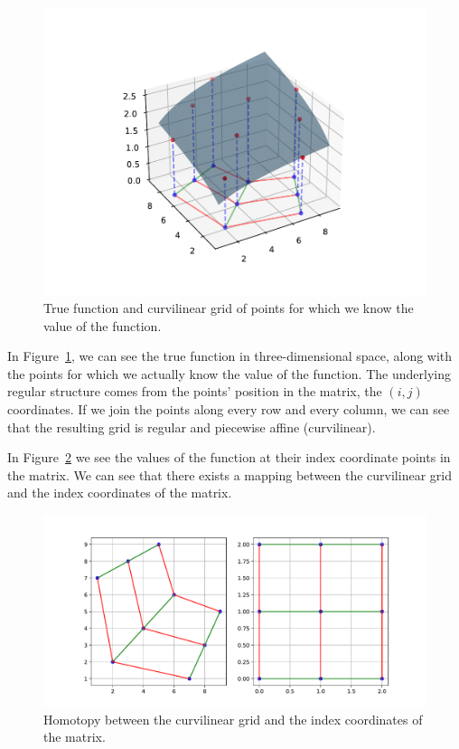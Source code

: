 \documentclass{article}
\begin{document}
\begin{figure}[!htbp]
\centering
\includegraphics[width=0.7\linewidth]{files/WarpedInterpolation-9513f6495d5e15630bda755d5a675faf.pdf}
\caption{True function and curvilinear grid of points for which we know the value of the function.}
\label{fig:warped_interp}
\end{figure}

In Figure~\ref{fig:warped_interp}, we can see the true function in three-dimensional space, along with the points for which we actually know the value of the function. The underlying regular structure comes from the points' position in the matrix, the $(i,j)$ coordinates. If we join the points along every row and every column, we can see that the resulting grid is regular and piecewise affine (curvilinear).

In Figure~\ref{fig:homotopy} we see the values of the function at their index coordinate points in the matrix. We can see that there exists a mapping between the curvilinear grid and the index coordinates of the matrix.

\begin{figure}[!htbp]
\centering
\includegraphics[width=0.7\linewidth]{files/Homotopy-b394e505e3f7dd8d05e911a79f145599.pdf}
\caption{Homotopy between the curvilinear grid and the index coordinates of the matrix.}
\label{fig:homotopy}
\end{figure}
\end{document}
